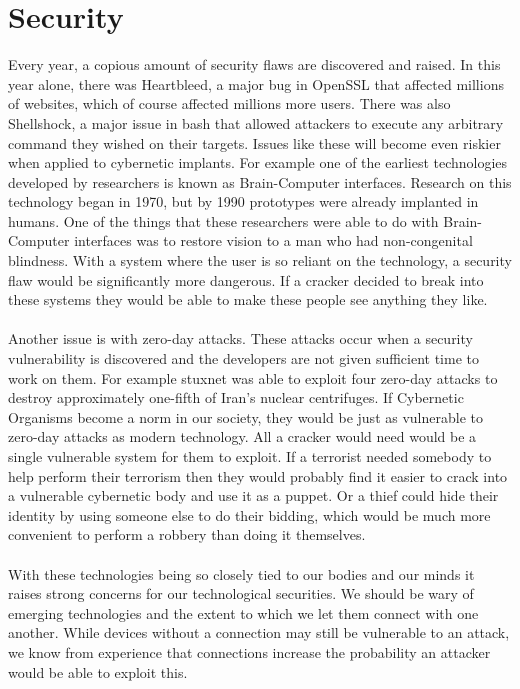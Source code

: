 \documentclass[12pt,a4paper,notitlepage]{article}
\begin{document}
\section{Security}
Every year, a copious amount of security flaws are discovered and raised. In
this year alone, there was Heartbleed\cite{Heartbleed}, a major bug in OpenSSL
that affected millions of websites, which of course affected millions more
users. There was also Shellshock\cite{Shellshock}, a major issue in bash that
allowed attackers to execute any arbitrary command they wished on their targets.
Issues like these will become even riskier when applied to cybernetic implants.
For example one of the earliest technologies developed by researchers is known
as Brain-Computer interfaces. Research on this technology began in 1970, but by
1990 prototypes were already implanted in humans. One of the things that these
researchers were able to do with Brain-Computer interfaces was to restore vision
to a man who had non-congenital blindness\cite{sight}. With a system where the
user is so reliant on the technology, a security flaw would be significantly
more dangerous. If a cracker decided to break into these systems they would be
able to make these people see anything they like.
\\\\
Another issue is with zero-day attacks. These attacks occur when a security
vulnerability is discovered and the developers are not given sufficient time to
work on them. For example stuxnet\cite{0day} was able to exploit four zero-day
attacks to destroy approximately one-fifth of Iran's nuclear centrifuges. If
Cybernetic Organisms become a norm in our society, they would be just as
vulnerable to zero-day attacks as modern technology. All a cracker would need
would be a single vulnerable system for them to exploit. If a terrorist needed
somebody to help perform their terrorism then they would probably find it easier
to crack into a vulnerable cybernetic body and use it as a puppet. Or a thief
could hide their identity by using someone else to do their bidding, which would
be much more convenient to perform a robbery than doing it themselves.
\\\\
With these technologies being so closely tied to our bodies and our minds it
raises strong concerns for our technological securities. We should be wary of
emerging technologies and the extent to which we let them connect with one
another. While devices without a connection may still be vulnerable to an
attack, we know from experience that connections increase the probability an
attacker would be able to exploit this.
\end{document}
